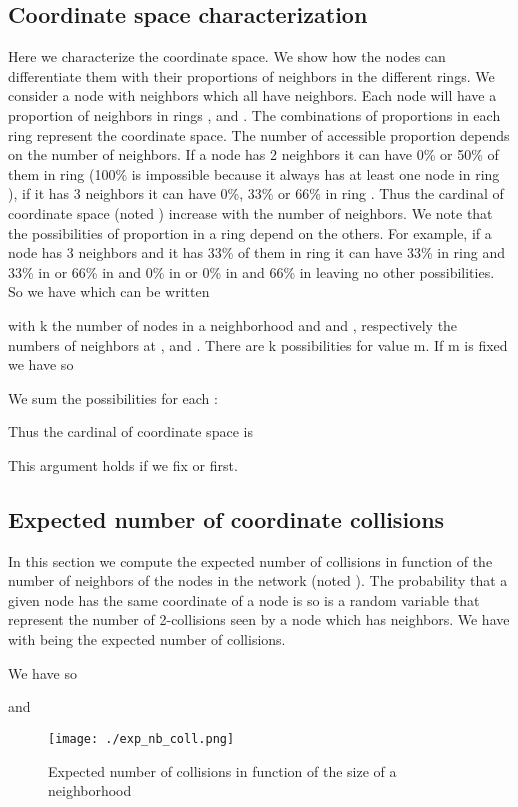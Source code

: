 \documentclass[a4paper]{article}
\begin{document}
\subsection{Coordinate space characterization}
Here we characterize the coordinate space. We show how the nodes can differentiate them with their proportions of neighbors in the different rings. We consider a node with  neighbors which all have  neighbors. Each node will have a proportion of neighbors in rings ,  and . The combinations of proportions in each ring represent the coordinate space. The number of accessible proportion depends on the number of neighbors. If a node has 2 neighbors it can have 0\% or 50\% of them in ring  (100\% is impossible because it always has at least one node in ring ), if it has 3 neighbors it can have 0\%, 33\% or 66\% in ring . Thus the cardinal of coordinate space (noted ) increase with the number of neighbors. We note that the possibilities of proportion in a ring depend on the others. For example, if a node has 3 neighbors and it has 33\% of them in ring  it can have 33\% in ring  and 33\% in  or 66\% in  and 0\% in  or 0\% in  and 66\% in  leaving no other possibilities. 
So we have  which can be written 


with k the number of nodes in a neighborhood and  and ,  respectively the numbers of neighbors at ,  and . There are k possibilities for value m. If m is fixed we have  so 

We sum the possibilities for each :

Thus the cardinal of coordinate space is 

This argument holds if we fix  or  first.

\subsection{Expected number of coordinate collisions}
In this section we compute the expected number of collisions in function of the number of neighbors of the nodes in the network (noted ). 
The probability that a given node  has the same coordinate of a node  is  so  is a random variable that represent the number of 2-collisions seen by a node which has  neighbors. We have  with  being the expected number of collisions.

We have  so



and 

\begin{figure}[!h]
  \centering
  \texttt{[image: ./exp\_nb\_coll.png]}
  \caption{Expected number of collisions in function of the size of a neighborhood}
  \label{theo}
\end{figure}
\end{document}
